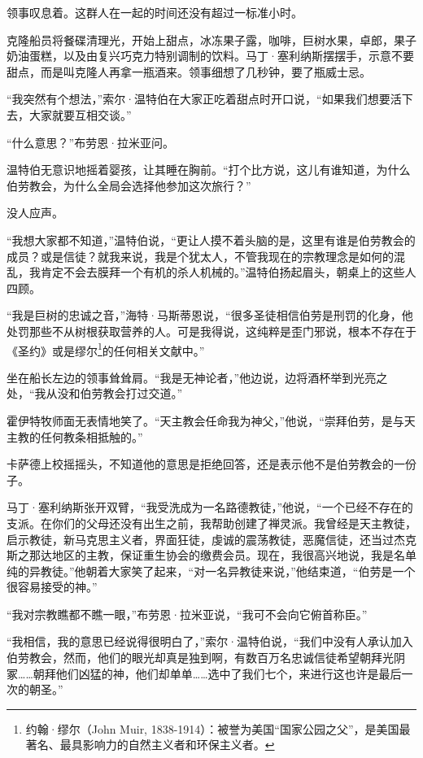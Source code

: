 \documentclass[AutoFakeBold=true]{book}
\begin{document}
领事叹息着。这群人在一起的时间还没有超过一标准小时。

克隆船员将餐碟清理光，开始上甜点，冰冻果子露，咖啡，巨树水果，卓郎，果子奶油蛋糕，以及由复兴巧克力特别调制的饮料。马丁·塞利纳斯摆摆手，示意不要甜点，而是叫克隆人再拿一瓶酒来。领事细想了几秒钟，要了瓶威士忌。

\vspace*{1em}

``我突然有个想法，''索尔·温特伯在大家正吃着甜点时开口说，``如果我们想要活下去，大家就要互相交谈。''

``什么意思？''布劳恩·拉米亚问。

温特伯无意识地摇着婴孩，让其睡在胸前。``打个比方说，这儿有谁知道，为什么伯劳教会，为什么全局会选择他参加这次旅行？''

没人应声。

``我想大家都不知道，''温特伯说，``更让人摸不着头脑的是，这里有谁是伯劳教会的成员？或是信徒？就我来说，我是个犹太人，不管我现在的宗教理念是如何的混乱，我肯定不会去膜拜一个有机的杀人机械的。''温特伯扬起眉头，朝桌上的这些人四顾。

``我是巨树的忠诚之音，''海特·马斯蒂恩说，``很多圣徒相信伯劳是刑罚的化身，他处罚那些不从树根获取营养的人。可是我得说，这纯粹是歪门邪说，根本不存在于《圣约》或是缪尔\footnote{约翰·缪尔（John Muir, 1838-1914）：被誉为美国``国家公园之父''，是美国最著名、最具影响力的自然主义者和环保主义者。}的任何相关文献中。''

坐在船长左边的领事耸耸肩。``我是无神论者，''他边说，边将酒杯举到光亮之处，``我从没和伯劳教会打过交道。''

霍伊特牧师面无表情地笑了。``天主教会任命我为神父，''他说，``崇拜伯劳，是与天主教的任何教条相抵触的。''

卡萨德上校摇摇头，不知道他的意思是拒绝回答，还是表示他不是伯劳教会的一份子。

马丁·塞利纳斯张开双臂，``我受洗成为一名路德教徒，''他说，``一个已经不存在的支派。在你们的父母还没有出生之前，我帮助创建了禅灵派。我曾经是天主教徒，启示教徒，新马克思主义者，界面狂徒，虔诚的震荡教徒，恶魔信徒，还当过杰克斯之那达地区的主教，保证重生协会的缴费会员。现在，我很高兴地说，我是名单纯的异教徒。''他朝着大家笑了起来，``对一名异教徒来说，''他结束道，``伯劳是一个很容易接受的神。''

``我对宗教瞧都不瞧一眼，''布劳恩·拉米亚说，``我可不会向它俯首称臣。''

``我相信，我的意思已经说得很明白了，''索尔·温特伯说，``我们中没有人承认加入伯劳教会，然而，他们的眼光却真是独到啊，有数百万名忠诚信徒希望朝拜光阴冢……朝拜他们凶猛的神，他们却单单……选中了我们七个，来进行这也许是最后一次的朝圣。''
\end{document}
